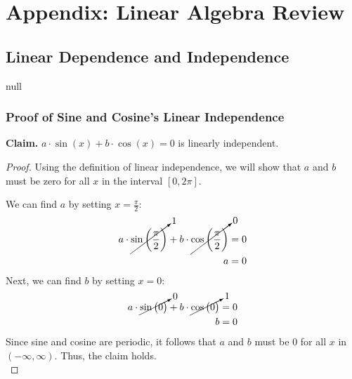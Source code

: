 \chapter{Appendix: Linear Algebra Review}
\section{Linear Dependence and Independence}
null
\subsection{Proof of Sine and Cosine's Linear Independence}
\vspace{0.5cm}
\textbf{Claim. } $a \cdot \sin(x) + b \cdot \cos(x) = 0$ is linearly independent.
    \begin{proof}
        Using the definition of linear independence, we will show that $a$ and $b$ must be zero for all $x$ in the interval $[0, 2\pi]$.
        
        \vspace{0.5cm}
        \noindent
        We can find $a$ by setting $x = \frac{\pi}{2}$:
        \begin{align*}
            a \cdot \cancelto{1}{\sin \bigg(\frac{\pi}{2} \bigg)}
            + b \cdot \cancelto{0}{\cos \bigg(\frac{\pi}{2} \bigg)} &= 0\\
            a &= 0
        \end{align*}
        Next, we can find $b$ by setting $x = 0$:
        \begin{align*}
            a \cdot \cancelto{0}{\sin \big(0 \big)}
            + b \cdot \cancelto{1}{\cos \big(0 \big)} &= 0\\
            b &= 0
        \end{align*}
        \noindent
        Since sine and cosine are periodic, it follows that $a$ and $b$ must be $0$ for all $x$ in $(-\infty, \infty)$.  Thus, the claim holds.\\
    \end{proof}
